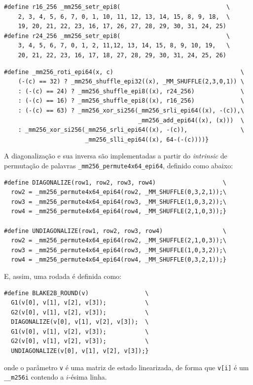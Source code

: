 \documentclass{article}
\begin{document}
\begin{small}
\begin{verbatim}
#define r16_256 _mm256_setr_epi8(                              \
    2, 3, 4, 5, 6, 7, 0, 1, 10, 11, 12, 13, 14, 15, 8, 9, 18,  \
    19, 20, 21, 22, 23, 16, 17, 26, 27, 28, 29, 30, 31, 24, 25)
#define r24_256 _mm256_setr_epi8(                              \
    3, 4, 5, 6, 7, 0, 1, 2, 11,12, 13, 14, 15, 8, 9, 10, 19,   \
    20, 21, 22, 23, 16, 17, 18, 27, 28, 29, 30, 31, 24, 25, 26)
\end{verbatim}
\end{small}
\newpage
\begin{small}
\begin{verbatim}
#define _mm256_roti_epi64(x, c)                                    \
    (-(c) == 32) ? _mm256_shuffle_epi32((x), _MM_SHUFFLE(2,3,0,1)) \
    : (-(c) == 24) ? _mm256_shuffle_epi8((x), r24_256)             \
    : (-(c) == 16) ? _mm256_shuffle_epi8((x), r16_256)             \
    : (-(c) == 63) ? _mm256_xor_si256(_mm256_srli_epi64((x), -(c)),\
                                      _mm256_add_epi64((x), (x)))  \
    : _mm256_xor_si256(_mm256_srli_epi64((x), -(c)),               \
                       _mm256_slli_epi64((x), 64-(-(c))))}
\end{verbatim}
\end{small}

A diagonalização e sua inversa são implementadas a partir do \emph{intrinsic}
de permutação de palavras \texttt{\_mm256\_permute4x64\_epi64}, definido como abaixo:

\begin{small}
\begin{verbatim}
#define DIAGONALIZE(row1, row2, row3, row4)                   \
  row2 = _mm256_permute4x64_epi64(row2, _MM_SHUFFLE(0,3,2,1));\
  row3 = _mm256_permute4x64_epi64(row3, _MM_SHUFFLE(1,0,3,2));\
  row4 = _mm256_permute4x64_epi64(row4, _MM_SHUFFLE(2,1,0,3));}

#define UNDIAGONALIZE(row1, row2, row3, row4)                 \
  row2 = _mm256_permute4x64_epi64(row2, _MM_SHUFFLE(2,1,0,3));\
  row3 = _mm256_permute4x64_epi64(row3, _MM_SHUFFLE(1,0,3,2));\
  row4 = _mm256_permute4x64_epi64(row4, _MM_SHUFFLE(0,3,2,1));}
\end{verbatim}
\end{small}

E, assim, uma rodada é definida como:

\begin{small}
\begin{verbatim}
#define BLAKE2B_ROUND(v)                \
  G1(v[0], v[1], v[2], v[3]);           \
  G2(v[0], v[1], v[2], v[3]);           \
  DIAGONALIZE(v[0], v[1], v[2], v[3]);  \
  G1(v[0], v[1], v[2], v[3]);           \
  G2(v[0], v[1], v[2], v[3]);           \
  UNDIAGONALIZE(v[0], v[1], v[2], v[3]);}
\end{verbatim}
\end{small}
onde o parâmetro \texttt{v} é uma matriz de estado linearizada, de forma
que \texttt{v[i]} é um \texttt{\_\_m256i} contendo a $i$-ésima linha.
\end{document}
